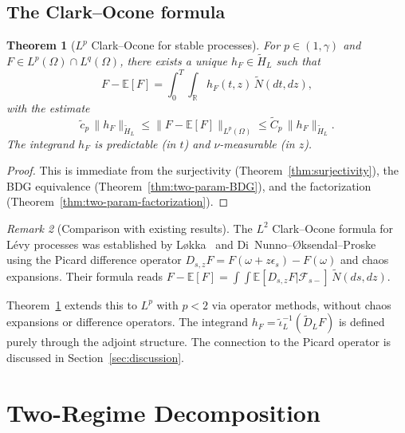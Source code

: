 \documentclass[11pt,a4paper]{article}
\theoremstyle{plain}
\newtheorem{theorem}{Theorem}[section]
\theoremstyle{definition}
\theoremstyle{remark}
\newtheorem{remark}[theorem]{Remark}
\newcommand{\E}{\mathbb{E}}
\newcommand{\R}{\mathbb{R}}
\begin{document}
\subsection{The Clark--Ocone formula}

\begin{theorem}[$L^p$ Clark--Ocone for stable processes]
\label{thm:clark-ocone}
For $p \in (1,\gamma)$ and $F \in L^p(\Omega) \cap L^q(\Omega)$,
there exists a unique $h_F \in \widetilde{H}_L$ such that
\begin{equation}\label{eq:clark-ocone}
  F - \E[F]
  = \int_0^T\!\!\int_{\R} h_F(t,z)\,\widetilde{N}(dt,dz),
\end{equation}
with the estimate
\begin{equation}\label{eq:CO-estimate}
  \tilde{c}_p\,\|h_F\|_{\widetilde{H}_L}
  \leq \|F - \E[F]\|_{L^p(\Omega)}
  \leq \tilde{C}_p\,\|h_F\|_{\widetilde{H}_L}.
\end{equation}
The integrand $h_F$ is predictable (in $t$) and
$\nu$-measurable (in $z$).
\end{theorem}

\begin{proof}
This is immediate from the surjectivity
(Theorem~\ref{thm:surjectivity}), the BDG equivalence
(Theorem~\ref{thm:two-param-BDG}), and the factorization
(Theorem~\ref{thm:two-param-factorization}).
\end{proof}

\begin{remark}[Comparison with existing results]
\label{rem:comparison}
The $L^2$ Clark--Ocone formula for L\'evy processes was
established by L{\o}kka~\cite{Lokka2004} and
Di~Nunno--{\O}ksendal--Proske~\cite{DiNunnoOksendalProske2009}
using the Picard difference operator $D_{s,z}F =
F(\omega + z\epsilon_s) - F(\omega)$ and chaos expansions.
Their formula reads
$F - \E[F] = \int\!\int \E[D_{s,z}F|\mathcal{F}_{s-}]
\,\widetilde{N}(ds,dz)$.

Theorem~\ref{thm:clark-ocone} extends this to $L^p$ with
$p < 2$ via operator methods, without chaos expansions or
difference operators.  The integrand
$h_F = \widetilde{\iota}_L^{-1}(\widetilde{D}_L F)$ is
defined purely through the adjoint structure.  The
connection to the Picard operator is discussed in
Section~\ref{sec:discussion}.
\end{remark}


\section{Two-Regime Decomposition}\label{sec:decomposition}
\end{document}
